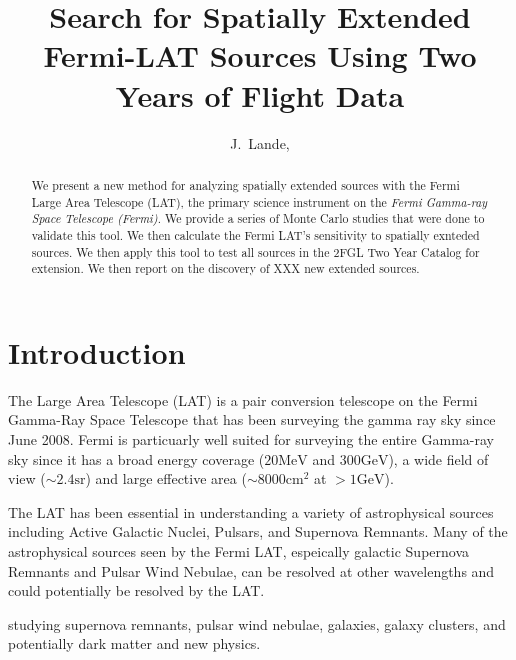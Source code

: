 \documentclass[preprint]{aastex}
\newcommand{\mev}{\text{MeV}}
\newcommand{\gev}{\text{GeV}}
\newcommand{\sr}{\text{sr}}
\newcommand{\cm}{\text{cm}}
\begin{document}
\title{Search for Spatially Extended Fermi-LAT Sources Using Two Years of Flight
Data}

\author{
J.~Lande, 
}


\begin{abstract}
We present a new method for analyzing spatially extended sources with
the Fermi Large Area Telescope (LAT), the primary science instrument
on the {\em Fermi Gamma-ray Space Telescope (Fermi)}.  We provide a
series of Monte Carlo studies that were done to validate this tool.
We then calculate the Fermi LAT's sensitivity to spatially exnteded
sources.
We then apply this tool to test all sources in the 2FGL Two Year Catalog
for extension.\cite{2FGL} We then report on the discovery of XXX new
extended sources.
\end{abstract}

\section{Introduction}


The Large Area Telescope (LAT) is a pair conversion telescope on the
Fermi Gamma-Ray Space Telescope that has been surveying the gamma ray
sky since June 2008.  Fermi is particuarly well suited for surveying
the entire Gamma-ray sky since it has a broad energy coverage ($20\mev$
and $300\gev$), a wide field of view ($\sim 2.4 \sr$) and large effective area
($\sim 8000 \cm^2$ at $>1\gev$).

The LAT has been essential in understanding a variety of astrophysical
sources including Active Galactic Nuclei, Pulsars, and Supernova Remnants.
Many of the astrophysical sources seen by the Fermi LAT, espeically
galactic Supernova Remnants and Pulsar Wind Nebulae, can be resolved at
other wavelengths and could potentially be resolved by the LAT.

studying supernova remnants, 
pulsar wind nebulae, 
galaxies,  galaxy clusters, and potentially dark matter and new physics.
\end{document}
